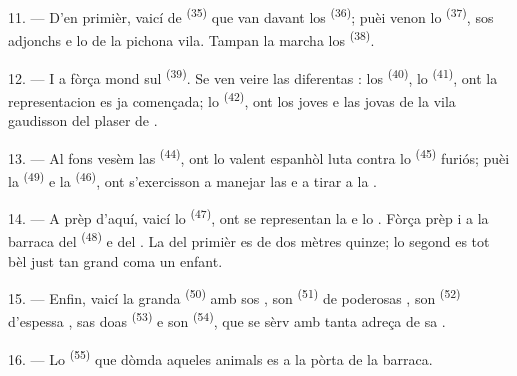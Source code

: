 11. --- D'en primièr, vaicí de  \textsuperscript{(35)}
que van davant los  \textsuperscript{(36)}; puèi venon lo
 \textsuperscript{(37)}, sos adjonchs e lo  de la pichona vila. Tampan la marcha los 
\textsuperscript{(38)}.

\VUsaut{5.0mm}
\VUsaut{3.6mm}

12. --- I a fòrça mond sul  \textsuperscript{(39)}. Se ven
veire las diferentas : los 
\textsuperscript{(40)}, lo  \textsuperscript{(41)}, ont la
representacion es ja començada; lo  \textsuperscript{(42)}, ont
los joves e las jovas de la vila gaudisson del plaser de .

13. --- Al fons vesèm las  \textsuperscript{(44)}, ont lo valent
 espanhòl luta contra lo  \textsuperscript{(45)}
furiós; puèi la  \textsuperscript{(49)} e la  \textsuperscript{(46)}, ont s'exercisson a manejar las  e a tirar a la .

14. --- A prèp d'aquí, vaicí lo  \textsuperscript{(47)},
ont se representan la  e lo . Fòrça prèp i a la
barraca del  \textsuperscript{(48)} e del . La
 del primièr es de dos mètres quinze; lo segond es tot bèl just tan
grand coma un enfant.

15. --- Enfin, vaicí la granda  \textsuperscript{(50)} amb sos
, son  \textsuperscript{(51)} de
poderosas , son  \textsuperscript{(52)} d'espessa
, sas doas  \textsuperscript{(53)} e son
 \textsuperscript{(54)}, que se sèrv amb tanta adreça de sa
.

16. --- Lo  \textsuperscript{(55)} que dòmda aqueles animals es a
la pòrta de la barraca.
\VUsaut{6.0mm}
\VUfilet{22mm}

